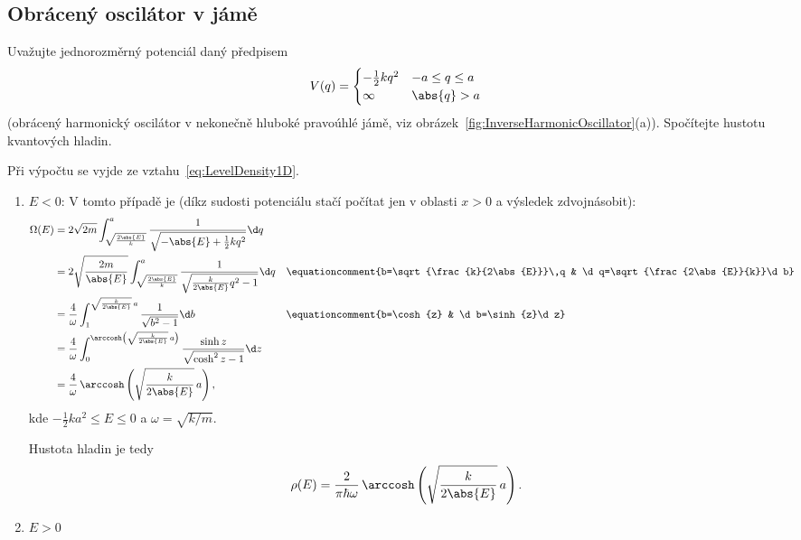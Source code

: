 \subsection{Obrácený oscilátor v jámě}
	Uvažujte jednorozměrný potenciál daný předpisem
	\begin{equation}\label{eq:InverseHarmonicOscillator}
		V(q)=
			\begin{cases}
				-\frac{1}{2}kq^{2} & -a\leq q\leq a\\
				\infty & \abs{q}>a
			\end{cases}
	\end{equation}
	(obrácený harmonický oscilátor v nekonečně hluboké pravoúhlé jámě, viz obrázek~\ref{fig:InverseHarmonicOscillator}(a)).
	Spočítejte hustotu kvantových hladin.
	
	\begin{solution}
		Při výpočtu se vyjde ze vztahu~\eqref{eq:LevelDensity1D}.
		
		\begin{enumerate}
			\item $E<0$:		
				V tomto případě je (díkz sudosti potenciálu stačí počítat jen v oblasti $x>0$ a výsledek zdvojnásobit):
				\begin{align*}
				\Omega(E)
					&=2\sqrt{2m}\int_{\sqrt{\frac{2\abs{E}}{k}}}^{a}\frac{1}{\sqrt{-\abs{E}+\frac{1}{2}kq^{2}}}\d q\\
					&=2\sqrt{\frac{2m}{\abs{E}}}\int_{\sqrt{\frac{2\abs{E}}{k}}}^{a}\frac{1}{\sqrt{\frac{k}{2\abs{E}}q^{2}-1}}\d q
					&&\equationcomment{b=\sqrt{\frac{k}{2\abs{E}}}\,q & \d q=\sqrt{\frac{2\abs{E}}{k}}\d b}\\
					&=\frac{4}{\omega}\int_{1}^{\sqrt{\frac{k}{2\abs{E}}}\,a}\frac{1}{\sqrt{b^{2}-1}}\d b
					&&\equationcomment{b=\cosh{z} & \d b=\sinh{z}\d z}\\
					&=\frac{4}{\omega}\int_{0}^{\arccosh\left(\sqrt{\frac{k}{2\abs{E}}}\,a\right)}
						\frac{\sinh{z}}{\sqrt{\cosh^{2}{z}-1}}\d z\\
					&=\frac{4}{\omega}\,\arccosh\left(\sqrt{\frac{k}{2\abs{E}}}\,a\right),
				\end{align*}
				kde $-\frac{1}{2}ka^{2}\leq E\leq0$ a $\omega=\sqrt{k/m}$.
				
				Hustota hladin je tedy
				\begin{equation*}
					\rho(E)
						=\frac{2}{\pi\hbar\omega}\,\arccosh\left(\sqrt{\frac{k}{2\abs{E}}}\,a\right).
				\end{equation*}
			
			\item $E>0$
			

\end{enumerate}
\end{solution}
